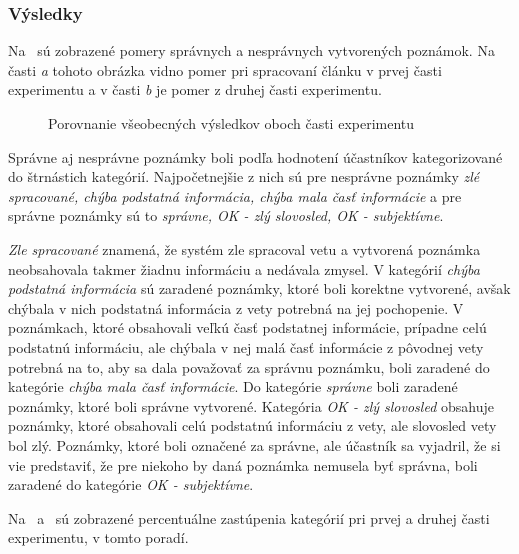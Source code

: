 \subsubsection{Výsledky}
\label{experiments:main_experiment:results}
Na~ sú zobrazené pomery správnych a nesprávnych vytvorených poznámok. Na časti \textit{a} tohoto obrázka vidno pomer pri spracovaní článku v prvej časti experimentu a v časti \textit{b} je pomer z druhej časti experimentu.

\begin{figure}[H]%
	\centering
	\qquad
	\caption{Porovnanie všeobecných výsledkov oboch časti experimentu}%
	\label{experiments:user_experiment:results:fig:exp_general_comparison}%
\end{figure}

Správne aj nesprávne poznámky boli podľa hodnotení účastníkov kategorizované do štrnástich kategórií. Najpočetnejšie z nich sú pre nesprávne poznámky \textit{zlé spracované, chýba podstatná informácia, chýba mala časť informácie} a pre správne poznámky sú to \textit{správne, OK - zlý slovosled, OK - subjektívne}.

\textit{Zle spracované} znamená, že systém zle spracoval vetu a vytvorená poznámka neobsahovala takmer žiadnu informáciu a nedávala zmysel. V kategórií \textit{chýba podstatná informácia} sú zaradené poznámky, ktoré boli korektne vytvorené, avšak chýbala v nich podstatná informácia z vety potrebná na jej pochopenie. V poznámkach, ktoré obsahovali veľkú časť podstatnej informácie, prípadne celú podstatnú informáciu, ale chýbala v nej malá časť informácie z pôvodnej vety potrebná na to, aby sa dala považovať za správnu poznámku, boli zaradené do kategórie \textit{chýba mala časť informácie}. Do kategórie \textit{správne} boli zaradené poznámky, ktoré boli správne vytvorené. Kategória \textit{OK - zlý slovosled} obsahuje poznámky, ktoré obsahovali celú podstatnú informáciu z vety, ale slovosled vety bol zlý. Poznámky, ktoré boli označené za správne, ale účastník sa vyjadril, že si vie predstaviť, že pre niekoho by daná poznámka nemusela byť správna, boli zaradené do kategórie \textit{OK - subjektívne}.

Na~ a~ sú zobrazené percentuálne zastúpenia kategórií pri prvej a druhej časti experimentu, v tomto poradí.

